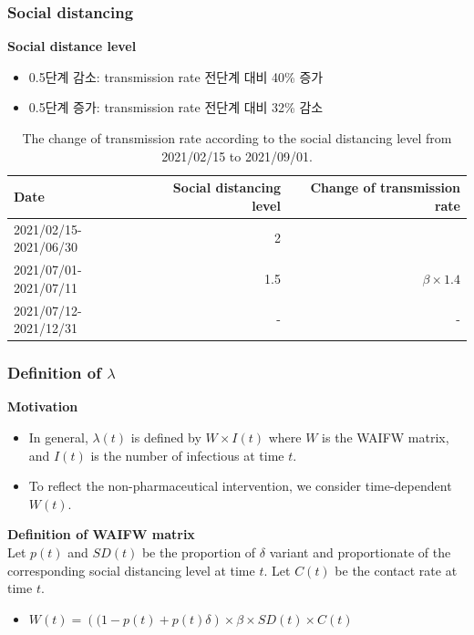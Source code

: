 \documentclass[aspectratio=169, 9pt, xcolor=dvipsnames]{beamer}
\begin{document}
	\begin{frame}\frametitle{Social distancing}
		\textbf{Social distance level}
		\begin{itemize}
			\item 0.5단계 감소: transmission rate 전단계 대비 40\% 증가
			\item 0.5단계 증가: transmission rate 전단계 대비 32\% 감소
		\end{itemize}
	    \begin{table}
	    	\begin{tabular}{lrr}
	    		\toprule
	    		\textbf{Date} & \textbf{Social distancing level} & \textbf{Change of transmission rate} \\
	    		\midrule
	    		2021/02/15-2021/06/30 & 2 &  \\
	    		2021/07/01-2021/07/11 & 1.5 & $\beta \times 1.4$ \\
	    		2021/07/12-2021/12/31\footnotemark[2] & - & - \\
	    		\bottomrule
	    	\end{tabular}
	    	\caption{The change of transmission rate according to the social distancing level from 2021/02/15 to 2021/09/01.}
	    \end{table}
	\end{frame}

	\begin{frame}\frametitle{Definition of $\lambda$}
		\textbf{Motivation}
	    \begin{itemize}
	    	\item In general, $\lambda(t)$ is defined by $W \times I(t)$ where $W$ is the WAIFW matrix, and $I(t)$ is the number of infectious at time $t$.
	    	\item To reflect the non-pharmaceutical intervention, we consider time-dependent $W(t)$.
	    \end{itemize}
	    \vspace{0.5cm}
	    \textbf{Definition of WAIFW matrix} \\
	    Let $p(t)$ and $SD(t)$ be the proportion of $\delta$ variant and proportionate of the corresponding social distancing level at time $t$. Let $C(t)$ be the contact rate at time $t$.
	    \begin{itemize}
	    	\item $W(t) = \left((1 - p(t) + p(t) \delta\right) \times \beta \times SD(t) \times C(t)$
	    \end{itemize}
	\end{frame}
\end{document}
